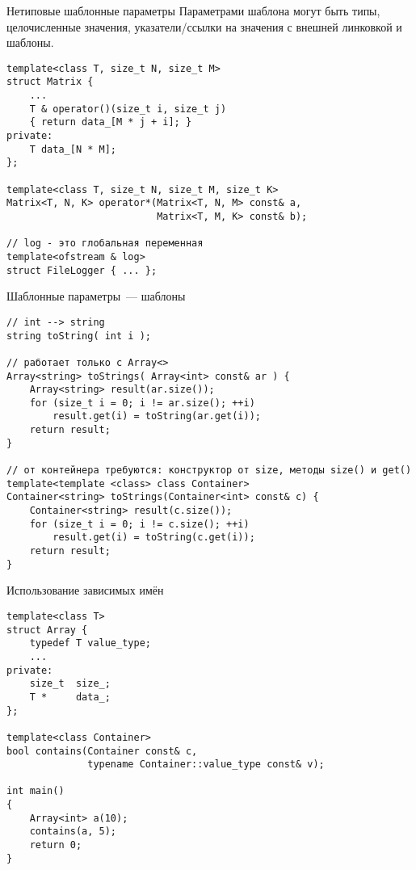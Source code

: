 \documentclass{beamer}
\begin{document}
\begin{frame}[fragile]{Нетиповые шаблонные параметры}
\small
Параметрами шаблона могут быть типы, целочисленные значения, 
указатели/ссылки на значения с внешней линковкой и шаблоны.
    \begin{lstlisting}
template<class T, size_t N, size_t M>
struct Matrix {
    ...
    T & operator()(size_t i, size_t j) 
    { return data_[M * j + i]; }
private:
    T data_[N * M];
};

template<class T, size_t N, size_t M, size_t K>
Matrix<T, N, K> operator*(Matrix<T, N, M> const& a, 
                          Matrix<T, M, K> const& b);

// log - это глобальная переменная
template<ofstream & log>
struct FileLogger { ... };
    \end{lstlisting}
\end{frame}

\begin{frame}[fragile]{Шаблонные параметры~--- шаблоны}
\small
    \begin{lstlisting}
// int --> string
string toString( int i );

// работает только с Array<>
Array<string> toStrings( Array<int> const& ar ) {
    Array<string> result(ar.size());
    for (size_t i = 0; i != ar.size(); ++i)
        result.get(i) = toString(ar.get(i));
    return result;
}

// от контейнера требуются: конструктор от size, методы size() и get()
template<template <class> class Container>
Container<string> toStrings(Container<int> const& c) {
    Container<string> result(c.size());
    for (size_t i = 0; i != c.size(); ++i)
        result.get(i) = toString(c.get(i));
    return result;
}
    \end{lstlisting}
\end{frame}

\begin{frame}[fragile]{Использование зависимых имён}
\small
    \begin{lstlisting}
template<class T>
struct Array {
    typedef T value_type;
    ...
private:
    size_t  size_;
    T *     data_;
};

template<class Container>
bool contains(Container const& c, 
              typename Container::value_type const& v);

int main()
{
    Array<int> a(10);
    contains(a, 5);
    return 0;
}

    \end{lstlisting}
\end{frame}
\end{document}
